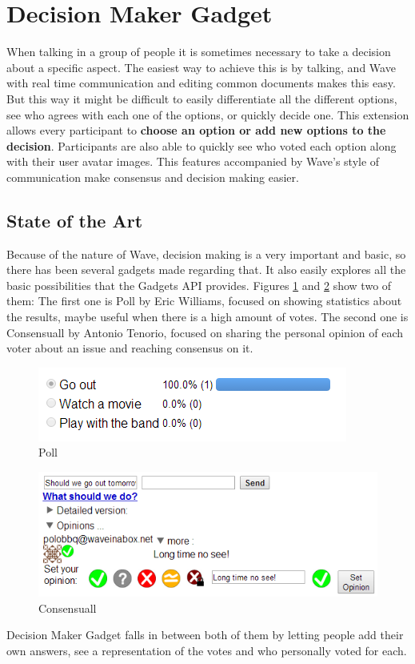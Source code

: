 \section{Decision Maker Gadget}
When talking in a group of people it is sometimes necessary to take a decision about a specific aspect. The easiest way to achieve this is by talking, and Wave with real time communication and editing common documents makes this easy. But this way it might be difficult to easily differentiate all the different options, see who agrees with each one of the options, or quickly decide one. This extension allows every participant to \textbf{choose an option or add new options to the decision}. Participants are also able to quickly see who voted each option along with their user avatar images. This features accompanied by Wave's style of communication make consensus and decision making easier.

\label{subsec:decision_soa}
\subsection{State of the Art}
Because of the nature of Wave, decision making is a very important and basic, so there has been several gadgets made regarding that. It also easily explores all the basic possibilities that the Gadgets API provides. Figures \ref{fig:poll} and \ref{fig:consensuall} show two of them: The first one is Poll by Eric Williams, focused on showing statistics about the results, maybe useful when there is a high amount of votes. The second one is Consensuall by Antonio Tenorio, focused on sharing the personal opinion of each voter about an issue and reaching consensus on it.\\[.2cm]
\begin{figure}[H]
  \center
    \includegraphics[keepaspectratio, scale=0.7]{Media/Captures/Extensions/DecisionGadgets/other.png}
  \caption{Poll}
  \label{fig:poll}
\end{figure}
\begin{figure}[h]
  \center    
    \includegraphics[keepaspectratio, scale=0.7]{Media/Captures/Extensions/DecisionGadgets/consensuall.png}
  \caption{Consensuall}
  \label{fig:consensuall}
\end{figure}
Decision Maker Gadget falls in between both of them by letting people add their own answers, see a representation of the votes and who personally voted for each.

